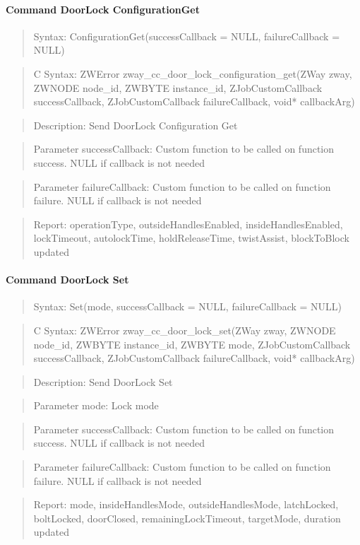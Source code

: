 \paragraph{Command DoorLock ConfigurationGet}
\begin{quote}Syntax: ConfigurationGet(successCallback = NULL, failureCallback = NULL)\end{quote}
\begin{quote}C Syntax: ZWError zway\_cc\_door\_lock\_configuration\_get(ZWay zway, ZWNODE node\_id, ZWBYTE instance\_id, ZJobCustomCallback successCallback, ZJobCustomCallback failureCallback, void* callbackArg)\end{quote}
\begin{quote}Description: Send DoorLock Configuration Get\end{quote}
\begin{quote}Parameter successCallback: Custom function to be called on function success. NULL if callback is not needed\end{quote}
\begin{quote}Parameter failureCallback: Custom function to be called on function failure. NULL if callback is not needed\end{quote}
\begin{quote}Report: operationType, outsideHandlesEnabled, insideHandlesEnabled, lockTimeout, autolockTime, holdReleaseTime, twistAssist, blockToBlock updated\end{quote}

\paragraph{Command DoorLock Set}
\begin{quote}Syntax: Set(mode, successCallback = NULL, failureCallback = NULL)\end{quote}
\begin{quote}C Syntax: ZWError zway\_cc\_door\_lock\_set(ZWay zway, ZWNODE node\_id, ZWBYTE instance\_id, ZWBYTE mode, ZJobCustomCallback successCallback, ZJobCustomCallback failureCallback, void* callbackArg)\end{quote}
\begin{quote}Description: Send DoorLock Set\end{quote}
\begin{quote}Parameter mode: Lock mode\end{quote}
\begin{quote}Parameter successCallback: Custom function to be called on function success. NULL if callback is not needed\end{quote}
\begin{quote}Parameter failureCallback: Custom function to be called on function failure. NULL if callback is not needed\end{quote}
\begin{quote}Report: mode, insideHandlesMode, outsideHandlesMode, latchLocked, boltLocked, doorClosed, remainingLockTimeout, targetMode, duration updated\end{quote}

